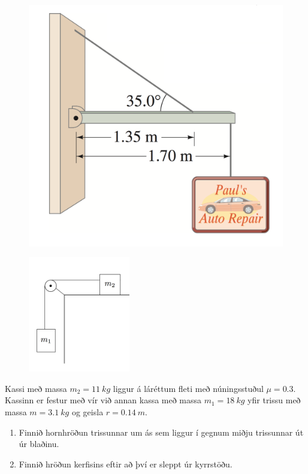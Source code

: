 \ifdefined \wholebook \else\documentclass[oneside]{book}\usepackage{EdlBook}\graphicspath{{figures/}}
\begin{document}
\begin{enumerate}[label = \textbf{Dæmi \thechapter.\arabic*.}]
\begin{figure}[H]
    \centering
    \includegraphics[scale = 0.3]{images/anna.png}
\end{figure}


\begin{minipage}{\linewidth}

\begin{figure}
\vspace{-1.4cm}
\includegraphics[width=1.75in]{images/trissa.png}
\end{figure}
\item Kassi með massa $m_2 = \SI{11}{kg}$ liggur á láréttum fleti með núningsstuðul $\mu = 0.3$. Kassinn er festur með vír við annan kassa með massa $m_1 = \SI{18}{kg}$ yfir trissu með massa $m = \SI{3.1}{kg}$ og geisla $r = \SI{0.14}{m}$.
\begin{enumerate}
    \item Finnið hornhröðun trissunnar um ás sem liggur í gegnum miðju trissunnar út úr blaðinu.
    \item Finnið hröðun kerfisins eftir að því er sleppt úr kyrrstöðu.
\end{enumerate}
\end{minipage}


\end{enumerate}
\end{document}
